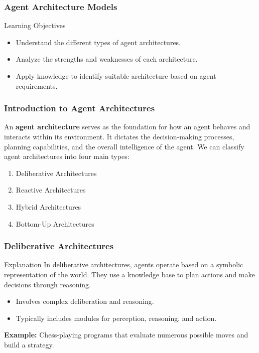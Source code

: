 \documentclass[aspectratio=169]{beamer}
\begin{document}
\begin{frame}[fragile]
  \frametitle{Agent Architecture Models}
  \begin{block}{Learning Objectives}
    \begin{itemize}
      \item Understand the different types of agent architectures.
      \item Analyze the strengths and weaknesses of each architecture.
      \item Apply knowledge to identify suitable architecture based on agent requirements.
    \end{itemize}
  \end{block}
\end{frame}

\begin{frame}[fragile]
  \frametitle{Introduction to Agent Architectures}
  An \textbf{agent architecture} serves as the foundation for how an agent behaves and interacts within its environment. It dictates the decision-making processes, planning capabilities, and the overall intelligence of the agent. We can classify agent architectures into four main types:
  \begin{enumerate}
    \item Deliberative Architectures
    \item Reactive Architectures
    \item Hybrid Architectures
    \item Bottom-Up Architectures
  \end{enumerate}
\end{frame}

\begin{frame}[fragile]
  \frametitle{Deliberative Architectures}
  \begin{block}{Explanation}
    In deliberative architectures, agents operate based on a symbolic representation of the world. They use a knowledge base to plan actions and make decisions through reasoning.
  \end{block}
  \begin{itemize}
    \item Involves complex deliberation and reasoning.
    \item Typically includes modules for perception, reasoning, and action.
  \end{itemize}
  \textbf{Example:} Chess-playing programs that evaluate numerous possible moves and build a strategy.
\end{frame}
\end{document}
